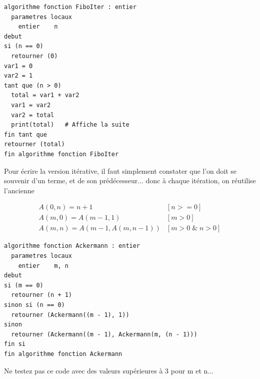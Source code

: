 \documentclass[11pt,a4paper]{article}
\begin{document}

\begin{table}[ht!]
  \centering
\begin{lstlisting}[style=algorithmique]
algorithme fonction FiboIter : entier
  parametres locaux
    entier    n
debut
si (n == 0)
  retourner (0)
var1 = 0
var2 = 1
tant que (n > 0)
  total = var1 + var2
  var1 = var2
  var2 = total
  print(total)   # Affiche la suite
fin tant que
retourner (total)
fin algorithme fonction FiboIter \end{lstlisting}
  \caption{Pour écrire la version itérative, il faut simplement constater que l'on doit se souvenir d'un terme, et de son prédécesseur... donc à chaque itération, on réutilise l'ancienne}
\end{table}

\bigskip

\newpage


\begin{equation*}
  \begin{aligned}
& A(0, n) = n + 1                 &  [n >= 0] & \\
& A(m, 0) = A(m - 1, 1)           &  [m > 0]  & \\
& A(m, n) = A(m - 1, A(m, n - 1)) &  [m > 0 \; \& \; n > 0] &
  \end{aligned}
\end{equation*}

\begin{table}[ht!]
  \centering
\begin{lstlisting}[style=algorithmique]
algorithme fonction Ackermann : entier
  parametres locaux
    entier    m, n
debut
si (m == 0)
  retourner (n + 1)
sinon si (n == 0)
  retourner (Ackermann((m - 1), 1))
sinon
  retourner (Ackermann((m - 1), Ackermann(m, (n - 1)))
fin si
fin algorithme fonction Ackermann \end{lstlisting}
  \caption{Ne testez pas ce code avec des valeurs supérieures à 3 pour m et n...}
\end{table}


\bigskip

\end{document}
